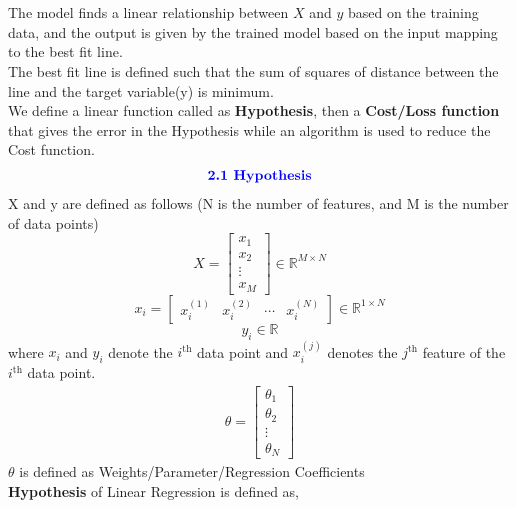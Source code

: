 \documentclass{homework}
\begin{document}
\section{}
The model finds a linear relationship between $X$ and $y$ based on the training data, and the output is given by the trained model based on the input mapping to the best fit line.\\ 
The best fit line is defined such that the sum of squares of distance between the line and the target variable(y) is minimum.\\
We define a linear function called as \textbf{Hypothesis}, then a \textbf{Cost/Loss function} that gives the error in the Hypothesis while an algorithm is used to reduce the Cost function.
\begin{align*}
    \textcolor{blue}{\text{{\textbf{2.1 Hypothesis}}}}
\end{align*}
X and y are defined as follows (N is the number of features, and M is the number of data points)
\begin{equation*}
  X = \begin{bmatrix} 
x_1\\x_2\\\vdots\\x_M 
\end{bmatrix}\in \mathbb{R}^{M \times N}
\end{equation*}
\begin{equation*}
x_i = \begin{bmatrix} x_{i}^{(1)}&x_{i}^{(2)}& \cdots & x_{i}^{(N)}\end{bmatrix} \in \mathbb{R}^{1\times N}
\end{equation*}
\begin{equation*}
y_i \in \mathbb{R}
\end{equation*}
where $x_i$ and $y_i$ denote the $i^\text{th}$ data point and $x_{i}^{(j)}$ denotes the $j^\text{th}$ feature of the $i^\text{th}$ data point.
\begin{align*}
    \theta = \begin{bmatrix}
\theta_1\\\theta_2\\\vdots\\\theta_N
\end{bmatrix}
\end{align*}
$\theta$ is defined as Weights/Parameter/Regression Coefficients\\
\textbf{Hypothesis} of Linear Regression is defined as,\\
\end{document}

